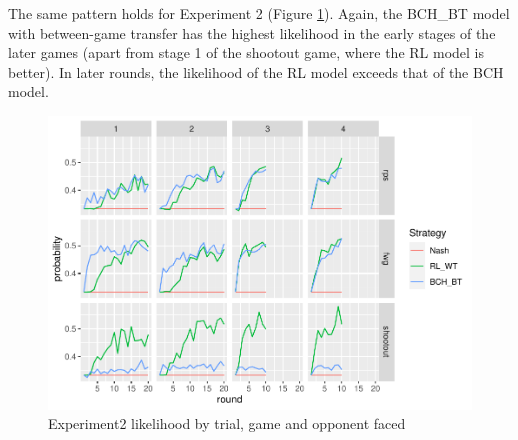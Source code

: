 \documentclass[smallextended]{svjour3}       %
\begin{document}
The same pattern holds for Experiment 2 (Figure
\ref{fig:exp2-lik-by-tr}). Again, the BCH\_BT model with between-game
transfer has the highest likelihood in the early stages of the later
games (apart from stage 1 of the shootout game, where the RL model is
better). In later rounds, the likelihood of the RL model exceeds that of
the BCH model.

\begin{figure}

{\centering \includegraphics[width=\textwidth]{CBB_v2_files/figure-latex/exp2-lik-by-tr-1} 

}

\caption{Experiment2 likelihood by trial, game and opponent faced}\label{fig:exp2-lik-by-tr}
\end{figure}
\end{document}
